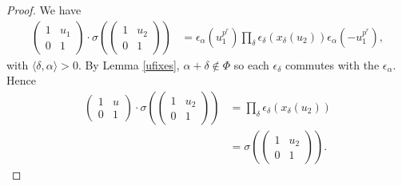 \begin{proof}
We have
\begin{align*}
\left(\begin{matrix}1 & u_1 \\ 0 & 1 \end{matrix}\right)
\cdot
\sigma\left(\left(\begin{matrix} 1 & u_2 \\ 0 & 1\end{matrix}\right)\right)
&=
\epsilon_\alpha(u_1^{p^r}) \prod_\delta \epsilon_\delta\left(x_\delta\left(u_2\right)\right) \epsilon_\alpha(-u_1^{p^r}),
\end{align*}
with $\langle \delta, \alpha \rangle > 0$. By Lemma \ref{ufixes}, $\alpha + \delta \notin \Phi$ so each $\epsilon_\delta$ commutes with the $\epsilon_\alpha$. Hence
\begin{align*}
  \left( \begin{matrix} 1 & u \\ 0 & 1 \end{matrix}\right) \cdot \sigma\left(\left(\begin{matrix} 1 & u_2 \\ 0 & 1 \end{matrix} \right)\right)
    &= 
    \prod_\delta \epsilon_\delta\left(x_\delta\left( u_2 \right)\right) \\
    &= 
    \sigma\left(\left(\begin{matrix} 1 & u_2 \\ 0 & 1 \end{matrix} \right) \right).
    \end{align*}
\end{proof}

